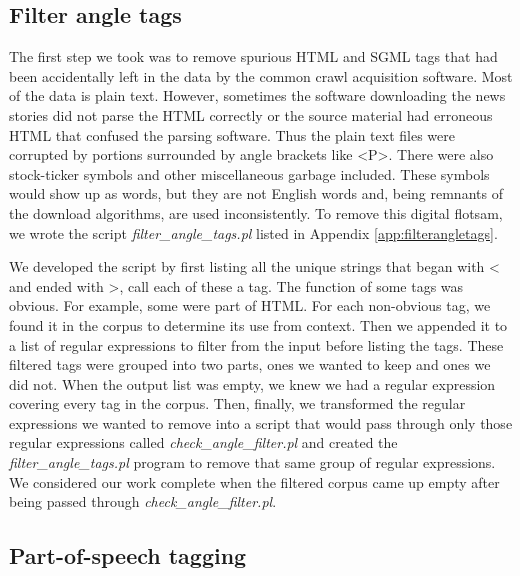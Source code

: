 \documentclass[10pt,letterpaper]{book}
\newcommand{\filename}[1]{\textit{#1}}
\begin{document}
\subsection{Filter angle tags}

The first step we took was to remove spurious HTML and SGML tags that had been accidentally left in the data by the common crawl acquisition software. Most of the data is plain text. However, sometimes the software downloading the news stories did not parse the HTML correctly or the source material had erroneous HTML that confused the parsing software. Thus the plain text files were corrupted by portions surrounded by angle brackets like <P>. There were also stock-ticker symbols and other miscellaneous garbage included. These symbols would show up as words, but they are not English words and, being remnants of the download algorithms, are used inconsistently. To remove this digital flotsam, we wrote the script \filename{filter\_angle\_tags.pl} listed in Appendix \ref{app:filterangletags}.

We developed the script by first listing all the unique strings that began with < and ended with >, call each of these a tag. The function of some tags was obvious. For example, some were part of HTML. For each non-obvious tag, we found it in the corpus to determine its use from context. Then we appended it to a list of regular expressions to filter from the input before listing the tags. These filtered tags were grouped into two parts, ones we wanted to keep and ones we did not. When the output list was empty, we knew we had a regular expression covering every tag in the corpus. Then, finally, we transformed the regular expressions we wanted to remove into a script that would pass through only those regular expressions called \filename{check\_angle\_filter.pl} and created the \filename{filter\_angle\_tags.pl} program to remove that same group of regular expressions. We considered our work complete when the filtered corpus came up empty after being passed through \filename{check\_angle\_filter.pl}.

\subsection{Part-of-speech tagging}
\end{document}
